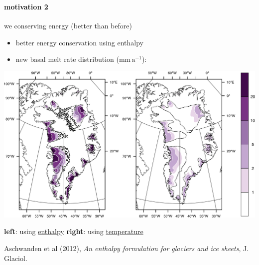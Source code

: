 \documentclass[hide notes,intlimits]{beamer}
\begin{document}
\begin{frame}
  \frametitle{\whytitle}
  \framesubtitle{motivation 2}

\vspace{-6mm}
\begin{center}
  we  conserving energy (better than before)
\end{center}
  
\vspace{-2mm}
  \begin{itemize}
    \item better energy conservation using enthalpy
    \item new basal melt rate distribution ($\text{mm}\,\text{a}^{-1}$):
  \end{itemize}

  \begin{center}
    \includegraphics[height=0.57\textheight]{enthalpy-model-crop}
    
    \medskip
    \scriptsize \textbf{left}: using \underline{enthalpy} \qquad\qquad\quad \textbf{right}: using \underline{temperature}

\medskip
    \tiny Aschwanden et al (2012), \emph{An enthalpy formulation for glaciers and ice sheets}, J. Glaciol.
  \end{center}
\end{frame}
\end{document}
